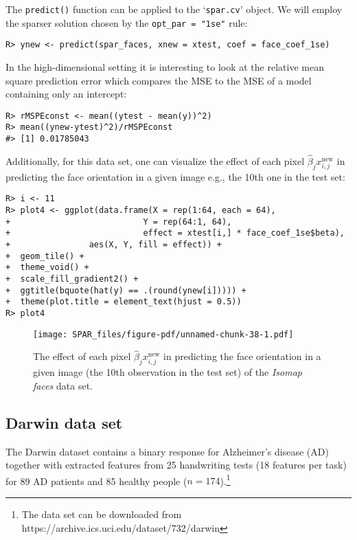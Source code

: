 \documentclass[
  article]{jss}
\begin{document}
The \texttt{predict()} function can be applied to the `\texttt{spar.cv}'
object. We will employ the sparser solution chosen by the
\texttt{opt\_par\ =\ "1se"} rule:

\begin{verbatim}
R> ynew <- predict(spar_faces, xnew = xtest, coef = face_coef_1se)
\end{verbatim}

In the high-dimensional setting it is interesting to look at the
relative mean square prediction error which compares the MSE to the MSE
of a model containing only an intercept:

\begin{verbatim}
R> rMSPEconst <- mean((ytest - mean(y))^2) 
R> mean((ynew-ytest)^2)/rMSPEconst
#> [1] 0.01785043
\end{verbatim}

Additionally, for this data set, one can visualize the effect of each
pixel \(\hat\beta_j x^\text{new}_{i,j}\) in predicting the face
orientation in a given image e.g., the 10th one in the test set:

\begin{verbatim}
R> i <- 11
R> plot4 <- ggplot(data.frame(X = rep(1:64, each = 64),
+                           Y = rep(64:1, 64),
+                           effect = xtest[i,] * face_coef_1se$beta), 
+                aes(X, Y, fill = effect)) +
+  geom_tile() +
+  theme_void() +
+  scale_fill_gradient2() +
+  ggtitle(bquote(hat(y) == .(round(ynew[i])))) +
+  theme(plot.title = element_text(hjust = 0.5)) 
R> plot4
\end{verbatim}

\begin{figure}[H]

{\centering \texttt{[image: SPAR\_files/figure-pdf/unnamed-chunk-38-1.pdf]}

}

\caption{The effect of each pixel \(\hat\beta_j x^\text{new}_{i,j}\) in
predicting the face orientation in a given image (the 10th observation
in the test set) of the \emph{Isomap faces} data set.
\label{fig:faces_predictions}}

\end{figure}%

\subsection{Darwin data set}\label{darwin-data-set}

The Darwin dataset \citep{CILIA2022darwin} contains a binary response
for Alzheimer's disease (AD) together with extracted features from 25
handwriting tests (18 features per task) for 89 AD patients and 85
healthy people
(\(n=174\)).\footnote{The data set can be downloaded from  https://archive.ics.uci.edu/dataset/732/darwin}
\end{document}
